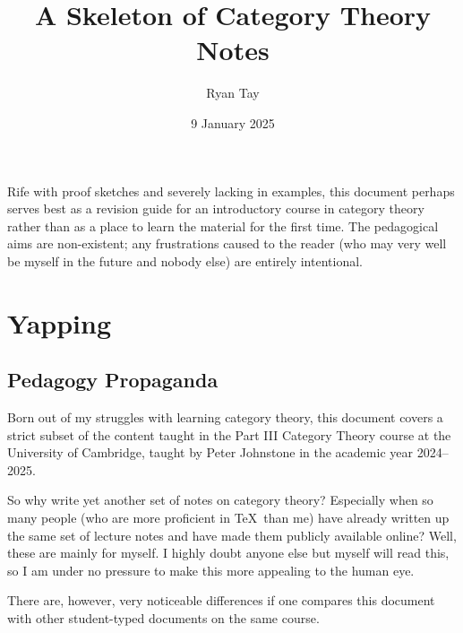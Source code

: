 \documentclass[a4paper,11pt]{article}
\title{A Skeleton of Category Theory Notes}
\author{Ryan Tay}
\date{9 January 2025}
\theoremstyle{break_italics}
\theoremstyle{break_upright}
\theoremstyle{remark}
\begin{document}
\maketitle


Rife with proof sketches and severely lacking in examples, this document perhaps serves best as a revision guide for an introductory course in category theory rather than as a place to learn the material for the first time. The pedagogical aims are non-existent; any frustrations caused to the reader (who may very well be myself in the future and nobody else) are entirely intentional.


\tableofcontents

\clearpage \newpage
\setcounter{section}{-1}
\section{Yapping}

\subsection{Pedagogy Propaganda}

Born out of my struggles with learning category theory, this document covers a strict subset of the content taught in the Part III Category Theory course at the University of Cambridge, taught by Peter Johnstone in the academic year 2024--2025.

So why write yet another set of notes on category theory? Especially when so many people (who are more proficient in \TeX\ than me) have already written up the same set of lecture notes and have made them publicly available online? Well, these are mainly for myself. I highly doubt anyone else but myself will read this, so I am under no pressure to make this more appealing to the human eye.

There are, however, very noticeable differences if one compares this document with other student-typed documents on the same course.
\end{document}
